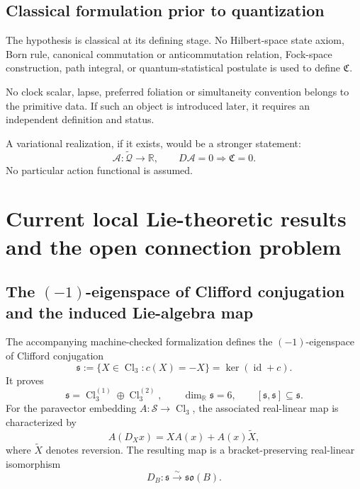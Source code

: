 \documentclass[11pt,a4paper]{article}
\theoremstyle{remark}
\newcommand{\R}{\mathbb{R}}
\newcommand{\Cl}{\operatorname{Cl}}
\newcommand{\Smodel}{\mathcal S}
\newcommand{\soB}{\mathfrak{so}(B)}
\newcommand{\tQ}{\widetilde{\mathcal Q}}
\newcommand{\id}{\operatorname{id}}
\begin{document}
\subsection{Classical formulation prior to quantization}

The hypothesis is classical at its defining stage.  No Hilbert-space state axiom, Born rule, canonical commutation or anticommutation relation, Fock-space construction, path integral, or quantum-statistical postulate is used to define \(\mathfrak C\).

No clock scalar, lapse, preferred foliation or simultaneity convention belongs to the primitive data.  If such an object is introduced later, it requires an independent definition and status.

A variational realization, if it exists, would be a stronger statement:
\begin{equation}
  \mathcal A:\tQ\longrightarrow\R,
  \qquad
  D\mathcal A=0
  \Longrightarrow
  \mathfrak C=0.
\tag{3.33}
\end{equation}
No particular action functional is assumed.

\section{Current local Lie-theoretic results and the open connection problem}

\subsection{The \texorpdfstring{$(-1)$}{-1}-eigenspace of Clifford conjugation and the induced Lie-algebra map}

The accompanying machine-checked formalization defines the \((-1)\)-eigenspace of Clifford conjugation
\begin{equation}
  \mathfrak s
  :=\{X\in\Cl_3:c(X)=-X\}
  =\ker(\id+c).
\tag{4.1}
\end{equation}
It proves
\begin{equation}
  \mathfrak s
  =\Cl_3^{(1)}\oplus\Cl_3^{(2)},
  \qquad
  \dim_{\R}\mathfrak s=6,
  \qquad
  [\mathfrak s,\mathfrak s]\subseteq\mathfrak s.
\tag{4.2}
\end{equation}
For the paravector embedding \(A:\Smodel\to\Cl_3\), the associated real-linear map is characterized by
\begin{equation}
  A(D_Xx)=X A(x)+A(x)\widetilde X,
\tag{4.3}
\end{equation}
where \(\widetilde X\) denotes reversion.  The resulting map is a bracket-preserving real-linear isomorphism
\begin{equation}
  D_B:\mathfrak s\xrightarrow{\sim}\soB.
\tag{4.4}
\end{equation}
\end{document}
